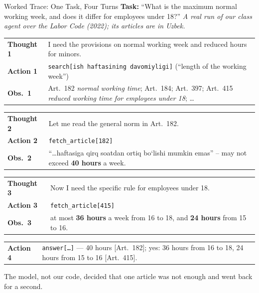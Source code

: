 \begin{frame}{Worked Trace: One Task, Four Turns}
\footnotesize
\textbf{Task:} ``What is the maximum normal working week, and does it differ for employees under 18?'' \emph{A real run of our class agent over the Labor Code (2022); its articles are in Uzbek.}
\smallskip

\scriptsize
\begin{tabular}{@{}p{1.5cm}p{}@{}}
\textcolor{RLBlue}{\textbf{Thought 1}} & I need the provisions on normal working week and reduced hours for minors. \\[1pt]
\textcolor{RLGreen}{\textbf{Action 1}}  & \texttt{search[ish haftasining davomiyligi]} \quad(``length of the working week'') \\[1pt]
\textbf{Obs.\ 1}                        & Art.~182 \emph{normal working time}; Art.~184; Art.~397; Art.~415 \emph{reduced working time for employees under 18}; \dots \\
\end{tabular}
\pause

\begin{tabular}{@{}p{1.5cm}p{}@{}}
\textcolor{RLBlue}{\textbf{Thought 2}} & Let me read the general norm in Art.~182. \\[1pt]
\textcolor{RLGreen}{\textbf{Action 2}}  & \texttt{fetch\_article[182]} \\[1pt]
\textbf{Obs.\ 2}                        & ``\dots haftasiga qirq soatdan ortiq bo\textquoteleft lishi mumkin emas'' -- may not exceed \textbf{40 hours} a week. \\
\end{tabular}
\pause

\begin{tabular}{@{}p{1.5cm}p{}@{}}
\textcolor{RLBlue}{\textbf{Thought 3}} & Now I need the specific rule for employees under 18. \\[1pt]
\textcolor{RLGreen}{\textbf{Action 3}}  & \texttt{fetch\_article[415]} \\[1pt]
\textbf{Obs.\ 3}                        & at most \textbf{36 hours} a week from 16 to 18, and \textbf{24 hours} from 15 to 16. \\
\end{tabular}
\pause

\begin{tabular}{@{}p{1.5cm}p{}@{}}
\textcolor{RLGreen}{\textbf{Action 4}}  & \texttt{answer[\dots]} --- 40 hours [Art.~182]; yes: 36 hours from 16 to 18, 24 hours from 15 to 16 [Art.~415]. \\
\end{tabular}

\smallskip
\footnotesize The model, not our code, decided that one article was not enough and went back for a second.
\end{frame}

